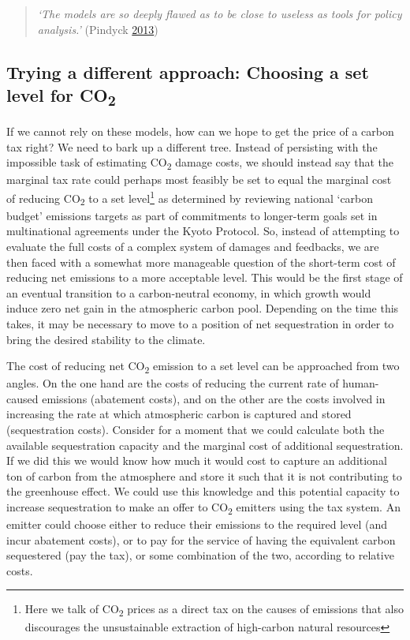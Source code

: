 \documentclass[]{tufte-handout}
\begin{document}
\begin{quote}
\emph{`The models are so deeply flawed as to be close to useless as
tools for policy analysis.'} (Pindyck
\protect\hyperlink{ref-Pindyck2013}{2013})
\end{quote}

\hypertarget{trying-a-different-approach-choosing-a-set-level-for-co2}{%
\subsection{\texorpdfstring{Trying a different approach: Choosing a set
level for
CO\textsubscript{2}}{Trying a different approach: Choosing a set level for CO2}}\label{trying-a-different-approach-choosing-a-set-level-for-co2}}

If we cannot rely on these models, how can we hope to get the price of a
carbon tax right? We need to bark up a different tree. Instead of
persisting with the impossible task of estimating CO\textsubscript{2}
damage costs, we should instead say that the marginal tax rate could
perhaps most feasibly be set to equal the marginal cost of reducing
CO\textsubscript{2} to a set level\footnote{Here we talk of
  CO\textsubscript{2} prices as a direct tax on the causes of emissions
  that also discourages the unsustainable extraction of high-carbon
  natural resources} as determined by reviewing national `carbon budget'
emissions targets as part of commitments to longer-term goals set in
multinational agreements under the Kyoto Protocol. So, instead of
attempting to evaluate the full costs of a complex system of damages and
feedbacks, we are then faced with a somewhat more manageable question of
the short-term cost of reducing net emissions to a more acceptable
level. This would be the first stage of an eventual transition to a
carbon-neutral economy, in which growth would induce zero net gain in
the atmospheric carbon pool. Depending on the time this takes, it may be
necessary to move to a position of net sequestration in order to bring
the desired stability to the climate.

The cost of reducing net CO\textsubscript{2} emission to a set level can
be approached from two angles. On the one hand are the costs of reducing
the current rate of human-caused emissions (abatement costs), and on the
other are the costs involved in increasing the rate at which atmospheric
carbon is captured and stored (sequestration costs). Consider for a
moment that we could calculate both the available sequestration capacity
and the marginal cost of additional sequestration. If we did this we
would know how much it would cost to capture an additional ton of carbon
from the atmosphere and store it such that it is not contributing to the
greenhouse effect. We could use this knowledge and this potential
capacity to increase sequestration to make an offer to
CO\textsubscript{2} emitters using the tax system. An emitter could
choose either to reduce their emissions to the required level (and incur
abatement costs), or to pay for the service of having the equivalent
carbon sequestered (pay the tax), or some combination of the two,
according to relative costs.
\end{document}

